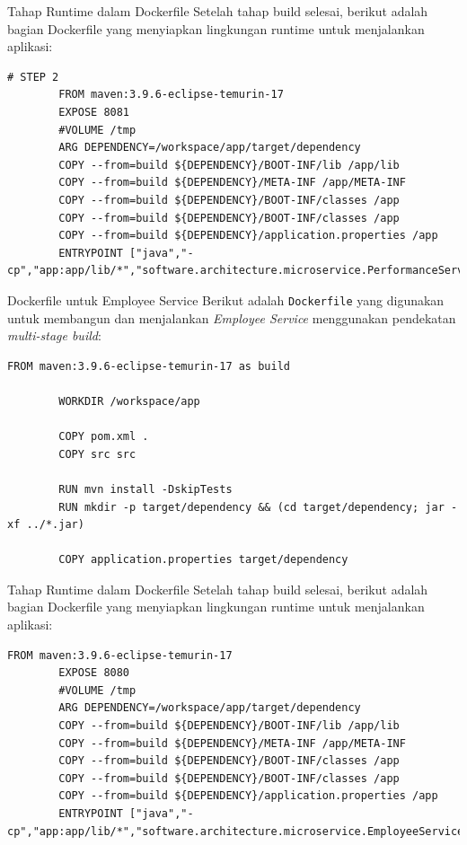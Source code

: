 \documentclass[aspectratio=169, table]{beamer}
\begin{document}
\begin{frame}[fragile]{Tahap Runtime dalam Dockerfile}
		\vspace{20pt}
	Setelah tahap build selesai, berikut adalah bagian Dockerfile yang menyiapkan lingkungan runtime untuk menjalankan aplikasi:
	
	\begin{lstlisting}[language=docker]
		# STEP 2
		FROM maven:3.9.6-eclipse-temurin-17
		EXPOSE 8081
		#VOLUME /tmp
		ARG DEPENDENCY=/workspace/app/target/dependency
		COPY --from=build ${DEPENDENCY}/BOOT-INF/lib /app/lib
		COPY --from=build ${DEPENDENCY}/META-INF /app/META-INF
		COPY --from=build ${DEPENDENCY}/BOOT-INF/classes /app
		COPY --from=build ${DEPENDENCY}/BOOT-INF/classes /app
		COPY --from=build ${DEPENDENCY}/application.properties /app
		ENTRYPOINT ["java","-cp","app:app/lib/*","software.architecture.microservice.PerformanceServiceApplication"]
	\end{lstlisting}
\end{frame}


\begin{frame}[fragile]{Dockerfile untuk Employee Service}
	\vspace{20pt}
	Berikut adalah \texttt{Dockerfile} yang digunakan untuk membangun dan menjalankan \textit{Employee Service} menggunakan pendekatan \textit{multi-stage build}:
	
	\begin{lstlisting}[language=docker]
		FROM maven:3.9.6-eclipse-temurin-17 as build
		
		WORKDIR /workspace/app
		
		COPY pom.xml .
		COPY src src
		
		RUN mvn install -DskipTests
		RUN mkdir -p target/dependency && (cd target/dependency; jar -xf ../*.jar)
		
		COPY application.properties target/dependency
	\end{lstlisting}
\end{frame}

\begin{frame}[fragile]{Tahap Runtime dalam Dockerfile}
	\vspace{20pt}
	Setelah tahap build selesai, berikut adalah bagian Dockerfile yang menyiapkan lingkungan runtime untuk menjalankan aplikasi:
	
	\begin{lstlisting}[language=docker]
		FROM maven:3.9.6-eclipse-temurin-17
		EXPOSE 8080
		#VOLUME /tmp
		ARG DEPENDENCY=/workspace/app/target/dependency
		COPY --from=build ${DEPENDENCY}/BOOT-INF/lib /app/lib
		COPY --from=build ${DEPENDENCY}/META-INF /app/META-INF
		COPY --from=build ${DEPENDENCY}/BOOT-INF/classes /app
		COPY --from=build ${DEPENDENCY}/BOOT-INF/classes /app
		COPY --from=build ${DEPENDENCY}/application.properties /app
		ENTRYPOINT ["java","-cp","app:app/lib/*","software.architecture.microservice.EmployeeServiceApplication"]
	\end{lstlisting}
\end{frame}
\end{document}
